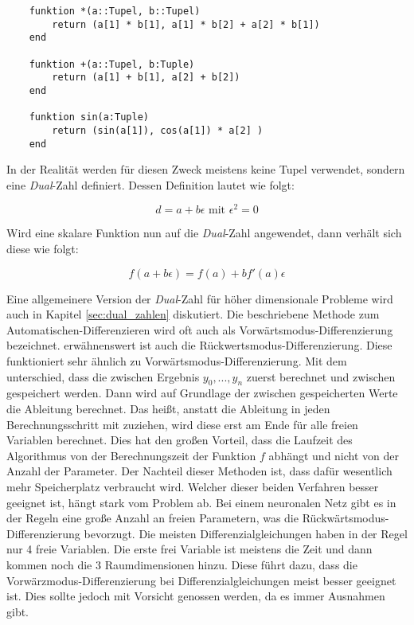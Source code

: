 \begin{lstlisting}
	funktion *(a::Tupel, b::Tupel)
    	return (a[1] * b[1], a[1] * b[2] + a[2] * b[1]) 
    end
    
    funktion +(a::Tupel, b:Tuple)
    	return (a[1] + b[1], a[2] + b[2])
    end
    
    funktion sin(a:Tuple)
    	return (sin(a[1]), cos(a[1]) * a[2] ) 
    end
\end{lstlisting}

In der Realität werden für diesen Zweck meistens keine Tupel verwendet, sondern eine \textit{Dual}-Zahl definiert.
Dessen Definition lautet wie folgt:

\begin{equation}
	d = a + b \epsilon \text{ mit } \epsilon^2 = 0
\end{equation}

Wird eine skalare Funktion nun auf die \textit{Dual}-Zahl angewendet, dann verhält sich diese wie folgt:

\begin{equation}
	f( a + b \epsilon) = f(a) + b f'(a) \epsilon
\end{equation}

Eine allgemeinere Version der \textit{Dual}-Zahl für höher dimensionale Probleme wird auch in Kapitel \ref{sec:dual_zahlen} diskutiert.
Die beschriebene Methode zum Automatischen-Differenzieren wird oft auch als Vorwärtsmodus-Differenzierung bezeichnet.
erwähnenswert ist auch die Rückwertsmodus-Differenzierung.
Diese funktioniert sehr ähnlich zu Vorwärtsmodus-Differenzierung.
Mit dem unterschied, dass die zwischen Ergebnis $y_0, ... , y_n$ zuerst berechnet und zwischen gespeichert werden.
Dann wird auf Grundlage der zwischen gespeicherten Werte die Ableitung berechnet.
Das heißt, anstatt die Ableitung in jeden Berechnungsschritt mit zuziehen, wird diese erst am Ende für alle freien Variablen berechnet.
Dies hat den großen Vorteil, dass die Laufzeit des Algorithmus von der Berechnungszeit der Funktion $f$ abhängt und nicht von der Anzahl der Parameter.
Der Nachteil dieser Methoden ist, dass dafür wesentlich mehr Speicherplatz verbraucht wird.
Welcher dieser beiden Verfahren besser geeignet ist, hängt stark vom Problem ab.
Bei einem neuronalen Netz gibt es in der Regeln eine große Anzahl an freien Parametern, was die Rückwärtsmodus-Differenzierung bevorzugt.
Die meisten Differenzialgleichungen haben in der Regel nur 4 freie Variablen.
Die erste frei Variable ist meistens die Zeit und dann kommen noch die 3 Raumdimensionen hinzu.
Diese führt dazu, dass die Vorwärzmodus-Differenzierung bei Differenzialgleichungen meist besser geeignet ist.
Dies sollte jedoch mit Vorsicht genossen werden, da es immer Ausnahmen gibt.
